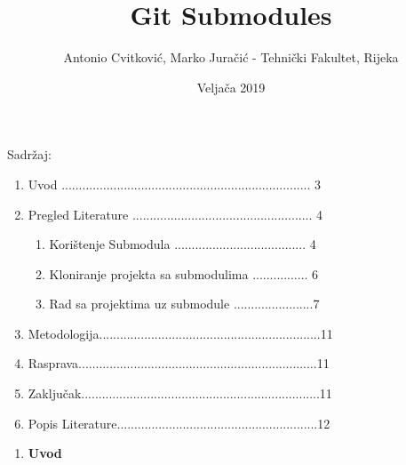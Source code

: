 \documentclass {article}
\begin{document}
\title{Git Submodules}
\author{Antonio Cvitković, Marko Juračić - Tehnički Fakultet, Rijeka}
\date{Veljača 2019}

\maketitle

\newpage

Sadržaj:


\begin{enumerate}
    \item Uvod ........................................................................ 3
    \item Pregled Literature .................................................... 4
        \begin{enumerate}
        \item Korištenje Submodula ...................................... 4
        \item Kloniranje projekta sa submodulima ................ 6
        \item Rad sa projektima uz submodule .......................7
        \end{enumerate}
    \item Metodologija................................................................11
    \item Rasprava.....................................................................11
    \item Zaključak.....................................................................11
    \item Popis Literature..........................................................12
\end{enumerate}

\newpage

\begin{enumerate}
    \item \textbf{Uvod}
\end{enumerate}
\end{document}
